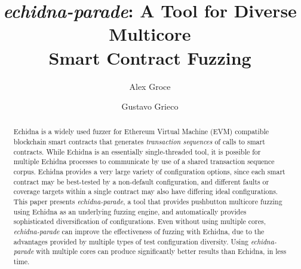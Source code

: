 \documentclass[sigconf]{acmart}
\begin{document}
\title[\emph{echidna-parade}: A Tool for Diverse Multicore Smart
Contract Fuzzing]{\emph{echidna-parade}: A Tool for Diverse Multicore\\Smart Contract Fuzzing}

\author{Alex Groce}
\author{Gustavo Grieco}


\renewcommand{\shortauthors}{Groce and Grieco}

\begin{abstract}
Echidna is a widely used fuzzer for Ethereum Virtual Machine (EVM) compatible blockchain smart
contracts that generates \emph{transaction sequences} of calls to smart contracts.  While Echidna is an essentially single-threaded tool, it
is possible for multiple Echidna processes to communicate by use of a shared
transaction sequence corpus.  Echidna provides a very large variety of configuration
options, since each smart contract may be best-tested by a non-default
configuration, and different faults or coverage targets within a
single contract may also have differing ideal configurations.  This
paper presents \emph{echidna-parade}, a tool that provides pushbutton
multicore fuzzing using Echidna as an underlying fuzzing engine, and
automatically provides sophisticated diversification of
configurations.   Even without using multiple cores, \emph{echidna-parade}
can improve the effectiveness of fuzzing with Echidna,
due to the advantages provided by multiple types of test configuration
diversity.  Using \emph{echidna-parade} with multiple cores can
produce significantly better results than Echidna, in less time.
\end{abstract}
\end{document}
